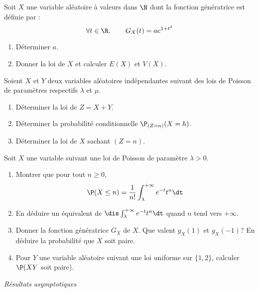 \documentclass[a4paper,10pt]{report}
\begin{document}
\begin{Exa} Soit $X$ une variable al\'eatoire \`a valeurs dans $\N$ dont la fonction g\'en\'eratrice est définie par :
$$\forall t\in\R,\qquad G_X(t)=ae^{1+t^2}$$

\begin{enumerate}
	\item D\'eterminer $a.$
	
	\item Donner la loi de $X$ et calculer $E(X)$ et $V(X).$
	
\end{enumerate}
\end{Exa}



\begin{Exa}
Soient $X$ et $Y$ deux variables aléatoires indépendantes suivant des lois de Poisson de paramètres respectifs $\lambda$ et $\mu$.
\begin{enumerate}
\item Déterminer la loi de $Z=X+Y$.
\item Déterminer la probabilité conditionnelle $\P_{(Z=n)}(X=h)$.
\item Déterminer la loi de $X$ sachant $(Z=n)$.
\end{enumerate}
\end{Exa}




\begin{Exa}
Soit $X$ une variable suivant une loi de Poisson de paramètre $\lambda>0$. 
\begin{enumerate}
\item Montrer que pour tout $n \geq 0$,
$$ \P(X \leq n) = \dfrac{1}{n!} \int_{\lambda}^{+ \infty} e^{-t} t^n \dt$$
\item En déduire un équivalent de $\dis \int_{\lambda}^{+ \infty} e^{-t} t^n \dt$ quand $n$ tend vers $+ \infty$.
\item Donner la fonction génératrice $G_X$ de $X$. Que valent $g_X(1)$ et $g_X(-1)$? En déduire la probabilité que $X$ soit paire.
\item Pour $Y$ une variable aléatoire suivant une loi uniforme sur $\lbrace 1,2 \rbrace$, calculer $\P(XY$ soit paire).
\end{enumerate}
\end{Exa}


\newpage


\begin{center}
\textit{{ {\large Résultats asymptotiques}}}
\end{center}
\end{document}
